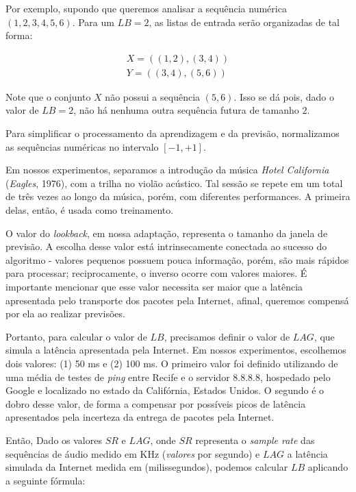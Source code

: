 Por exemplo, supondo que queremos analisar a sequência numérica $(1, 2, 3, 4, 5, 6)$. Para um $LB = 2$, as listas de entrada serão organizadas de tal forma:

\begin{equation}
\begin{split}
    X = ((1, 2), (3, 4)) \\
    Y = ((3, 4), (5, 6))
\end{split}
\end{equation}

Note que o conjunto $X$ não possui a sequência $(5,6)$. Isso se dá pois, dado o valor de $LB = 2$, não há nenhuma outra sequência futura de tamanho $2$.

Para simplificar o processamento da aprendizagem e da previsão, normalizamos as sequências numéricas no intervalo $[-1, +1]$.

Em nossos experimentos, separamos a introdução da música \textit{Hotel California} (\textit{Eagles}, 1976), com a trilha no violão acústico. Tal sessão se repete em um total de três vezes ao longo da música, porém, com diferentes performances. A primeira delas, então, é usada como treinamento.

O valor do \textit{lookback}, em nossa adaptação, representa o tamanho da janela de previsão. A escolha desse valor está intrinsecamente conectada ao sucesso do algoritmo - valores pequenos possuem pouca informação, porém, são mais rápidos para processar; reciprocamente, o inverso ocorre com valores maiores. É importante mencionar que esse valor necessita ser maior que a latência apresentada pelo transporte dos pacotes pela Internet, afinal, queremos compensá por ela ao realizar previsões.

Portanto, para calcular o valor de $LB$, precisamos definir o valor de $LAG$, que simula a latência apresentada pela Internet. Em nossos experimentos, escolhemos dois valores: (1) 50 ms e (2) 100 ms. O primeiro valor foi definido utilizando de uma média de testes de \textit{ping} entre Recife e o servidor 8.8.8.8, hospedado pelo Google e localizado no estado da Califórnia, Estados Unidos. O segundo é o dobro desse valor, de forma a compensar por possíveis picos de latência apresentados pela incerteza da entrega de pacotes pela Internet.

Então, Dado os valores $SR$ e $LAG$, onde $SR$ representa o \textit{sample rate} das sequências de áudio medido em KHz (\textit{valores} por segundo) e $LAG$ a latência simulada da Internet medida em (milissegundos), podemos calcular $LB$ aplicando a seguinte fórmula:

